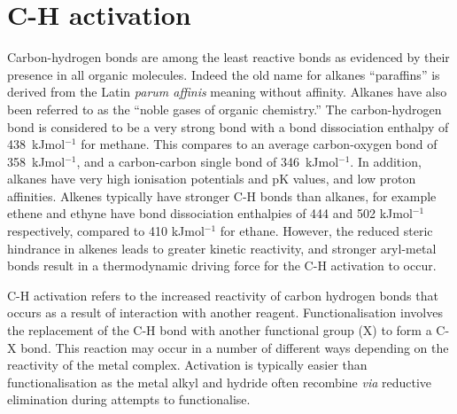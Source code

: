 \section{C-H activation}

Carbon-hydrogen bonds are among the least reactive bonds as evidenced by their presence in all organic molecules.\cite{Shilov1997}  Indeed the old name for alkanes ``paraffins'' is derived from the Latin \emph{parum affinis} meaning without affinity.  Alkanes have also been referred to as the ``noble gases of organic chemistry.''\cite{Shilov1997}  The carbon-hydrogen bond is considered to be a very strong bond with a bond dissociation enthalpy of 438~kJmol$^{-1}$ for methane.  This compares to an average carbon-oxygen bond of 358~kJmol$^{-1}$, and a carbon-carbon single bond of 346~kJmol$^{-1}$.  In addition, alkanes have very high ionisation potentials and pK values, and low proton affinities.\cite{Shilov2000}  Alkenes typically have stronger C-H bonds than alkanes, for example ethene and ethyne have bond dissociation enthalpies of 444 and 502 kJmol$^{-1}$ respectively, compared to 410 kJmol$^{-1}$ for ethane.\cite{Shilov1997}  However, the reduced steric hindrance in alkenes leads to greater kinetic reactivity, and stronger aryl-metal bonds result in a thermodynamic driving force for the C-H activation to occur.\cite{Crabtree2001}



C-H activation refers to the increased reactivity of carbon hydrogen bonds that occurs as a result of interaction with another reagent.\cite{Crabtree2001}  Functionalisation involves the replacement of the C-H bond with another functional group (X) to form a C-X bond.  This reaction may occur in a number of different ways depending on the reactivity of the metal complex.\cite{Shilov2000}  Activation is typically easier than functionalisation as the metal alkyl and hydride often recombine \emph{via} reductive elimination during attempts to functionalise.\cite{Crabtree2001}  



